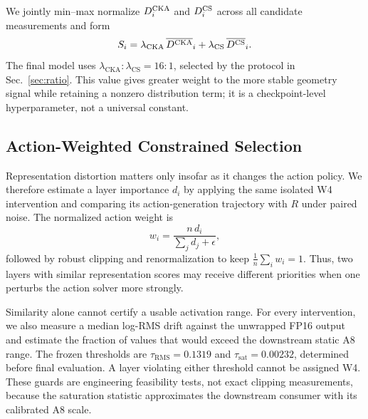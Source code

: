 We jointly min--max normalize $D^{\mathrm{CKA}}_i$ and $D^{\mathrm{CS}}_i$ across all candidate measurements and form
\begin{equation}
    S_i=\lambda_{\mathrm{CKA}}\,\overline{D^{\mathrm{CKA}}}_i
       +\lambda_{\mathrm{CS}}\,\overline{D^{\mathrm{CS}}}_i.
    \label{eq:dual_score}
\end{equation}
The final model uses $\lambda_{\mathrm{CKA}}:\lambda_{\mathrm{CS}}=16:1$, selected by the protocol in Sec.~\ref{sec:ratio}. This value gives greater weight to the more stable geometry signal while retaining a nonzero distribution term; it is a checkpoint-level hyperparameter, not a universal constant.

\subsection{Action-Weighted Constrained Selection}
\label{sec:selection}

Representation distortion matters only insofar as it changes the action policy. We therefore estimate a layer importance $d_i$ by applying the same isolated W4 intervention and comparing its action-generation trajectory with $R$ under paired noise. The normalized action weight is
\begin{equation}
    w_i=\frac{n\,d_i}{\sum_j d_j+\epsilon},
    \label{eq:action_weight}
\end{equation}
followed by robust clipping and renormalization to keep $\frac{1}{n}\sum_i w_i=1$. Thus, two layers with similar representation scores may receive different priorities when one perturbs the action solver more strongly.

Similarity alone cannot certify a usable activation range. For every intervention, we also measure a median log-RMS drift against the unwrapped FP16 output and estimate the fraction of values that would exceed the downstream static A8 range. The frozen thresholds are $\tau_{\mathrm{RMS}}=0.1319$ and $\tau_{\mathrm{sat}}=0.00232$, determined before final evaluation. A layer violating either threshold cannot be assigned W4. These guards are engineering feasibility tests, not exact clipping measurements, because the saturation statistic approximates the downstream consumer with its calibrated A8 scale.


